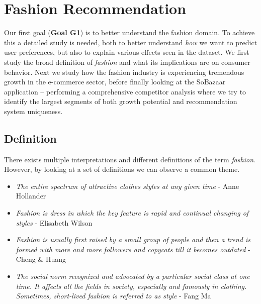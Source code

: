 
\section{Fashion Recommendation}
\label{sec:fashion-theory}

Our first goal (\textbf{Goal G1}) is to better understand the fashion domain.
To achieve this a detailed study is needed, both to better understand
\textit{how} we want to predict user preferences, but also to explain various
effects seen in the dataset. We first study the broad definition of
\textit{fashion} and what its implications are on consumer behavior. Next we
study how the fashion industry is experiencing tremendous growth in the
e-commerce sector, before finally looking at the SoBazaar application --
performing a comprehensive competitor analysis where we try to identify the
largest segments of both growth potential and recommendation system
uniqueness.

\subsection{Definition}

There exists multiple interpretations and different definitions of the term
\textit{fashion}. However, by looking at a set of definitions we can observe a
common theme.

\begin{itemize}
    \item \textit{The entire spectrum of attractive clothes styles at any given
    time} - Anne Hollander

    \item \textit{Fashion is dress in which the key feature is rapid and continual
    changing of styles} - Elisabeth Wilson

    \item \textit{Fashion is usually first raised by a small group of people
    and then a trend is formed with more and more followers and copycats till
    it becomes outdated} - Cheng \& Huang

    \item \textit{The social norm recognized and advocated by a particular
    social class at one time. It affects all the fields in society, especially
    and famously in clothing. Sometimes, short-lived fashion is referred to as
    style} - Fang Ma \cite{Fang2012}

\end{itemize}

